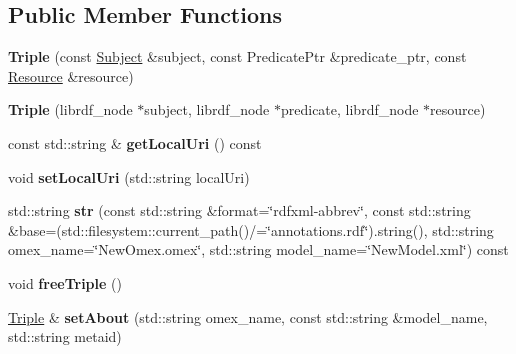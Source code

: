 \subsection*{Public Member Functions}
\begin{DoxyCompactItemize}
\item 
\mbox{\label{classomexmeta_1_1Triple_aaed857f9356dc3a7414f06f393a75ba0}} 
{\bfseries Triple} (const \hyperlink{classomexmeta_1_1Subject}{Subject} \&subject, const Predicate\+Ptr \&predicate\+\_\+ptr, const \hyperlink{classomexmeta_1_1Resource}{Resource} \&resource)
\item 
\mbox{\label{classomexmeta_1_1Triple_adc457c78ec059eb71602e7ea4f763582}} 
{\bfseries Triple} (librdf\+\_\+node $\ast$subject, librdf\+\_\+node $\ast$predicate, librdf\+\_\+node $\ast$resource)
\item 
\mbox{\label{classomexmeta_1_1Triple_a1cb45dd3a5778f0e0e92e4a185da9400}} 
const std\+::string \& {\bfseries get\+Local\+Uri} () const
\item 
\mbox{\label{classomexmeta_1_1Triple_a6694daa46597ea91dda045aa0d5e6cfc}} 
void {\bfseries set\+Local\+Uri} (std\+::string local\+Uri)
\item 
\mbox{\label{classomexmeta_1_1Triple_a6ba7ebce96994021abb492d2913f6462}} 
std\+::string {\bfseries str} (const std\+::string \&format=\char`\"{}rdfxml-\/abbrev\char`\"{}, const std\+::string \&base=(std\+::filesystem\+::current\+\_\+path()/=\char`\"{}annotations.\+rdf\char`\"{}).string(), std\+::string omex\+\_\+name=\char`\"{}New\+Omex.\+omex\char`\"{}, std\+::string model\+\_\+name=\char`\"{}New\+Model.\+xml\char`\"{}) const
\item 
\mbox{\label{classomexmeta_1_1Triple_a3f3868622349d3a3e14ed3e4b21d49a9}} 
void {\bfseries free\+Triple} ()
\item 
\mbox{\label{classomexmeta_1_1Triple_a2b673a8166a19fb4feae0fc42d31c105}} 
\hyperlink{classomexmeta_1_1Triple}{Triple} \& {\bfseries set\+About} (std\+::string omex\+\_\+name, const std\+::string \&model\+\_\+name, std\+::string metaid)
\item 

\end{DoxyCompactItemize}
